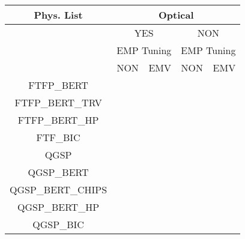 \documentclass[11pt]{article}
\begin{document}
\begin{center}
\begin{tabular}{|c|c|c|c|c|}
  \hline
  Phys. List           &           \multicolumn{4}{|c|}{Optical}                \\
  \hline
  {}                   & \multicolumn{2}{|c|}{YES}  & \multicolumn{2}{|c|}{NON} \\
  \hline
  {}                   & \multicolumn{2}{|c|}{EMP Tuning} & \multicolumn{2}{|c|}{EMP Tuning} \\
  \hline               &   NON       &   EMV        &   NON      &   EMV        \\
  \hline                                                                     
  \hline                                                                     
  FTFP\_BERT           &             &              &            &              \\
  \hline                                                                        
  FTFP\_BERT\_TRV      &             &              &            &              \\
  \hline                                                                        
  FTFP\_BERT\_HP       &             &              &            &              \\
  \hline                                                                        
  FTF\_BIC             &             &              &            &              \\
  \hline                                                                        
  \hline                                                                        
  QGSP                 &             &              &            &              \\
  \hline                                                                        
  QGSP\_BERT           &             &              &            &              \\
  \hline                                                                        
  QGSP\_BERT\_CHIPS    &             &              &            &              \\
  \hline                                                                        
  QGSP\_BERT\_HP       &             &              &            &              \\
  \hline                                                                        
  QGSP\_BIC            &             &              &            &              \\

\end{tabular}
\end{center}
\end{document}
